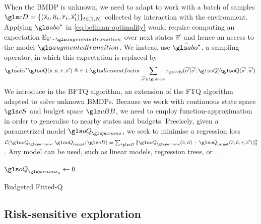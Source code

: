 When the \gls{BMDP} is unknown, we need to adapt  to work with a batch of samples $\cD=\{(\os_t,\oa_t,\overline{r}_t,\os_t')\}_{t\in [1,N]}$ collected by interaction with the environment. Applying $\abo^{\star}$ in \eqref{eq:bellman-optimality} would require computing an expectation $\expectedvalue_{\os'\sim \augmentedtransition}$ over next states $\overline{s}'$ and hence an access to the model $\augmentedtransition$. We instead use $\hat{\abo^{\star}}$, a sampling operator, in which this expectation is replaced by
\begin{equation*}
\hat{\abo^{\star}} \oQ(\os, \oa, \overline{r}, \os') \eqdef \overline{r} + \discount \sum_{\ov{a'}\in \ocA} \pi_\text{greedy}(\ov{a'}|\ov{s'}; \oQ) \oQ(\ov{s'}, \ov{a'}).
\end{equation*}
We introduce in  the \gls{BFTQ} algorithm, an extension of the \gls{FTQ} algorithm adapted to solve unknown \glspl{BMDP}. Because we work with continuous state space $\cS$ and budget space $\budgetspace$, we need to employ function-approximation in order to generalise to nearby states and budgets. Precisely, given a parametrized model $\oQ_\params$, we seek to minimise a regression loss $\cL(\oQ_\params, \oQ_\text{target};\cD) = \sum_{\cD} \|\oQ_\params(\os, \oa) - \oQ_\text{target}(\os, \oa, r, \os')\|_2^2$.
Any model can be used, such as linear models, regression trees, or .

\begin{algorithm}[ht]
	\DontPrintSemicolon
	\KwData{$\cD$}
	$\oQ_{\params_0} \leftarrow 0$\;
	\caption{Budgeted Fitted-Q}
	\label{algo:bftq}
\end{algorithm}

\subsection{Risk-sensitive exploration}
\label{sec:exploration}

